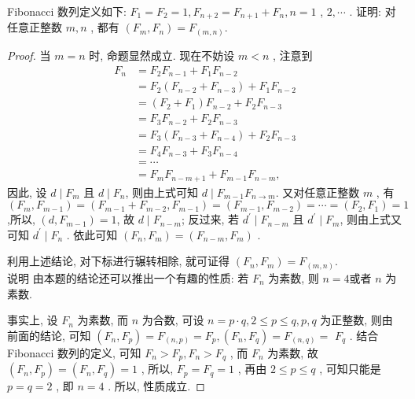 \begin{example}
	Fibonacci 数列定义如下:  $F_{1}=F_{2}=1, F_{n+2}=F_{n+1}+F_{n}, n=1$ ,  $2, \cdots$ . 证明: 对任意正整数 $m ,  n$ , 都有 $\left(F_{m}, F_{n}\right)=F_{(m, n)}$.
\end{example}
\begin{proof}
	当 $m=n$ 时, 命题显然成立. 现在不妨设 $m<n$ , 注意到
	\begin{align*}
	F_{n} & =F_{2} F_{n-1}+F_{1} F_{n-2}                     \\
	      & =F_{2}\left(F_{n-2}+F_{n-3}\right)+F_{1} F_{n-2} \\
	      & =\left(F_{2}+F_{1}\right) F_{n-2}+F_{2} F_{n-3}  \\
	      & =F_{3} F_{n-2}+F_{2} F_{n-3}                     \\
	      & =F_{3}\left(F_{n-3}+F_{n-4}\right)+F_{2} F_{n-3} \\
	      & =F_{4} F_{n-3}+F_{3} F_{n-4}                     \\
	      & =\cdots                                          \\
	      & =F_{m} F_{n-m+1}+F_{m-1} F_{n-m},
\end{align*}
因此, 设 $d \mid F_{m}$ 且 $d \mid F_{n}$, 则由上式可知 $d \mid F_{m-1} F_{n \rightarrow m}$. 又对任意正整数 $m$ , 有 $\left(F_{m}, F_{m-1}\right)=\left(F_{m-1}+F_{m-2}, F_{m-1}\right)=\left(F_{m-1}, F_{m-2}\right)=\cdots=\left(F_{2}, F_{1}\right)=1$,所以, $\left(d, F_{m-1}\right)=1$, 故 $d \mid F_{n-m}$; 反过来, 若 $d^{\prime} \mid F_{n-m}$ 且 $d^{\prime} \mid F_{m}$, 则由上式又可知 $d^{\prime} \mid F_{n}$ . 依此可知 $\left(F_{n}, F_{m}\right)=\left(F_{n-m}, F_{m}\right)$ .

利用上述结论, 对下标进行辗转相除, 就可证得 $\left(F_{n}, F_{m}\right)=F_{(m, n)}$.\\
说明 由本题的结论还可以推出一个有趣的性质: 若 $F_{n}$ 为素数, 则 $n=4$或者 $n$ 为素数.

事实上, 设 $F_{n}$ 为素数, 而 $n$ 为合数, 可设 $n=p \cdot q, 2 \leqslant p \leqslant q, p ,  q$ 为正整数, 则由前面的结论, 可知 $\left(F_{n}, F_{p}\right)=F_{(n, p)}=F_{p},\left(F_{n}, F_{q}\right)=F_{(n, q)}=$ $F_{q}$ . 结合 Fibonacci 数列的定义, 可知 $F_{n}>F_{p}, F_{n}>F_{q}$ , 而 $F_{n}$ 为素数, 故 $\left(F_{n}, F_{p}\right)=\left(F_{n}, F_{q}\right)=1$ , 所以,  $F_{p}=F_{q}=1$ , 再由 $2 \leqslant p \leqslant q$ , 可知只能是 $p=q=2$ , 即 $n=4$ . 所以, 性质成立.
\end{proof}

